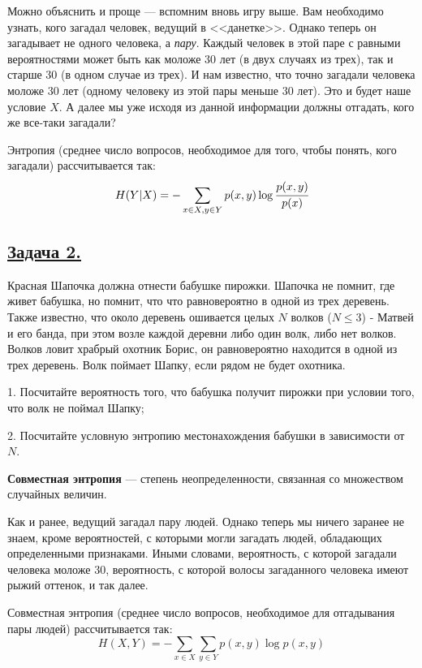 Можно объяснить и проще --- вспомним вновь игру выше. Вам необходимо узнать, кого загадал человек, ведущий в <<данетке>>. Однако теперь он загадывает не одного человека, а \textit{пару}. Каждый человек в этой паре с равными вероятностями может быть как моложе 30 лет (в двух случаях из трех), так и старше 30 (в одном случае из трех). И нам известно, что точно загадали человека моложе 30 лет (одному человеку из этой пары меньше 30 лет). Это и будет наше условие $X$. А далее мы уже исходя из данной информации должны отгадать, кого же все-таки загадали?

Энтропия (среднее число вопросов, необходимое для того, чтобы понять, кого загадали) рассчитывается так:
\[H(Y|X)=-\sum\limits_{x\in X, y\in Y} p(x, y)\log \cfrac{p(x, y)}{p(x)} \]

\subsection*{\hyperref[sec:sol_problem2]{Задача 2.}}\label{sec:problem2} Красная Шапочка должна отнести бабушке пирожки. Шапочка не помнит, где живет бабушка, но помнит, что что равновероятно в одной из трех деревень. Также известно, что около деревень ошивается целых $N$ волков ($N\leqslant3$) - Матвей и его банда, при этом возле каждой деревни либо один волк, либо нет волков. Волков ловит храбрый охотник Борис, он равновероятно находится в одной из трех деревень. Волк поймает Шапку, если рядом не будет охотника.

1. Посчитайте вероятность того, что бабушка получит пирожки при условии того, что волк не поймал Шапку; 

2. Посчитайте условную энтропию местонахождения бабушки в зависимости от $N$.  
\\

\begin{siderules}
    \textbf{Совместная энтропия} --- степень неопределенности, связанная со множеством случайных величин.
\end{siderules}

Как и ранее, ведущий загадал пару людей. Однако теперь мы ничего заранее не знаем, кроме вероятностей, с которыми могли загадать людей, обладающих определенными признаками. Иными словами, вероятность, с которой загадали человека моложе 30, вероятность, с которой волосы загаданного человека имеют рыжий оттенок, и так далее.

Совместная энтропия (среднее число вопросов, необходимое для отгадывания пары людей) рассчитывается так:
\[H(X, Y)=-\sum\limits_{x\in X}\sum\limits_{y\in Y} p(x, y)\log p(x ,y) \]

